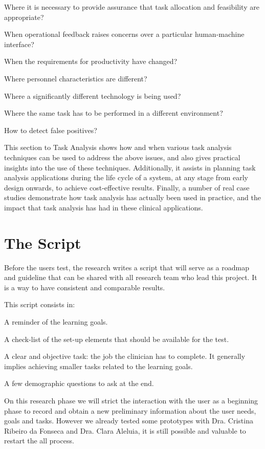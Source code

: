  Where it is necessary to provide assurance that task allocation and feasibility are appropriate?

 When operational feedback raises concerns over a particular human-machine
interface?

 When the requirements for productivity have changed?

 Where personnel characteristics are different?

 Where a significantly different technology is being used?

 Where the same task has to be performed in a different environment?

 How to detect false positives?

This section to Task Analysis shows how and when various task analysis techniques can be used to address the above issues, and also gives practical insights into the use of these techniques. Additionally, it assists in planning task analysis applications during the life cycle of a system, at any stage from early design onwards, to achieve cost-effective results. Finally, a number of real case studies demonstrate how task analysis has actually been used in practice, and the impact that task analysis has had in these clinical applications.

\clearpage

\section{The Script}

Before the users test, the research writes a script that will serve as a roadmap and guideline that can be shared with all research team who lead this project. It is a way to have consistent and comparable results.

This script consists in:

 A reminder of the learning goals.

 A check-list of the set-up elements that should be available for the test.

 A clear and objective task: the job the clinician has to complete. It generally implies achieving smaller tasks related to the learning goals.

 A few demographic questions to ask at the end.

On this research phase we will strict the interaction with the user as a beginning phase to record and obtain a new preliminary information about the user needs, goals and tasks. However we already tested some prototypes with Dra. Cristina Ribeiro da Fonseca and Dra. Clara Aleluia, it is still possible and valuable to restart the all process.

